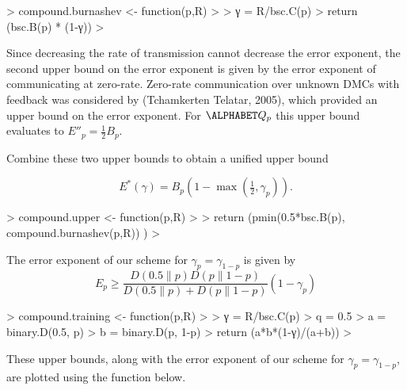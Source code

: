 \begin{Schunk}
\begin{Sinput}
>   compound.burnashev <- function(p,R)
>   {
>     γ = R/bsc.C(p)
>     return (bsc.B(p) * (1-γ))
>   }
\end{Sinput}
\end{Schunk}

Since decreasing the rate of transmission cannot decrease the error exponent,
the second upper bound on the error exponent is given by the error exponent of
communicating at zero-rate. Zero-rate communication over unknown DMCs with
feedback was considered by (Tchamkerten Telatar, 2005), which provided an
upper bound on the error exponent. For $\ALPHABET Q_p$ this upper bound
evaluates to $E''_p = \tfrac 12 B_p$. 

Combine these two upper bounds to obtain a unified upper bound

$$E^*(γ) = B_p (1 - \max(\tfrac 12, γ_p )).$$

\begin{Schunk}
\begin{Sinput}
>   compound.upper <- function(p,R)
>   {
>     return (pmin(0.5*bsc.B(p), compound.burnashev(p,R)) )
>   }
\end{Sinput}
\end{Schunk}

The error exponent of our scheme for $γ_p = γ_{1-p}$ is given by 
$$E_p ≥ \frac{D(0.5 \| p)   D(p \| 1-p)}
            {D(0.5\|p) + D(p \| 1-p)} 
            (1-γ_p)                         $$

\begin{Schunk}
\begin{Sinput}
>   compound.training <- function(p,R) 
>   {
>     γ = R/bsc.C(p)
>     q = 0.5
>     a = binary.D(0.5, p)
>     b = binary.D(p, 1-p)
>     return (a*b*(1-γ)/(a+b))
>   }
\end{Sinput}
\end{Schunk}

These upper bounds, along with the error exponent of our scheme for
$γ_p = γ_{1-p}$, are plotted using the function below.


